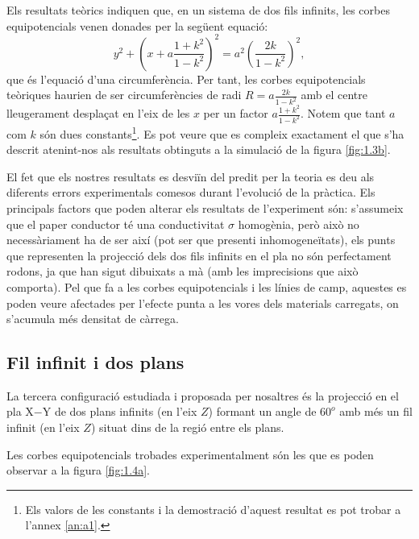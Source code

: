 \documentclass[a4paper,10.5pt]{report}
\begin{document}
Els resultats teòrics indiquen que, en un sistema de dos fils infinits, les corbes equipotencials venen donades per la següent equació:
\begin{equation}
	y^2+\left( x+a\frac{1+k^2}{1-k^2}\right)^2 = a^2\left( \frac{2k}{1-k^2}\right)^2  \label{eqsuppon},
\end{equation}
que és l'equació d'una circumferència. Per tant, les corbes equipotencials teòriques haurien de ser circumferències de radi $R = a\frac{2k}{1-k^2}$ amb el centre lleugerament desplaçat en l'eix de les $x$ per un factor $a\frac{1+k^2}{1-k^2}$. Notem que tant $a$ com $k$ són dues constants\footnote{Els valors de les constants i la demostració d'aquest resultat es pot trobar a l'annex \ref{an:a1}.}. Es pot veure que es compleix exactament el que s'ha descrit atenint-nos als resultats obtinguts a la simulació de la figura \ref{fig:1.3b}.

El fet que els nostres resultats es desviïn del predit per la teoria es deu als diferents errors experimentals comesos durant l'evolució de la pràctica. Els principals factors que poden alterar els resultats de l'experiment són: s'assumeix que el paper conductor té una conductivitat $\sigma$ homogènia, però això no necessàriament ha de ser així (pot ser que presenti inhomogeneïtats), els punts que representen la projecció dels dos fils infinits en el pla no són perfectament rodons, ja que han sigut dibuixats a mà (amb les imprecisions que això comporta). Pel que fa a les corbes equipotencials i les línies de camp, aquestes es poden veure afectades per l'efecte punta a les vores dels materials carregats, on s'acumula més densitat de càrrega. 


\subsection{Fil infinit i dos plans}

La tercera configuració estudiada i proposada per nosaltres és la projecció en el pla X$-$Y de dos plans infinits (en l'eix $Z$) formant un angle de $60^o$ amb més un fil infinit (en l'eix $Z$) situat dins de la regió entre els plans.

Les corbes equipotencials trobades experimentalment són les que es poden observar a la figura \ref{fig:1.4a}.
\end{document}
